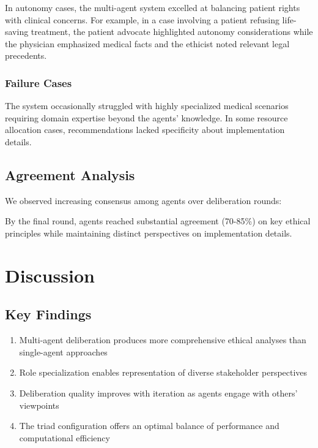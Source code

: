 \documentclass[11pt]{article}
\begin{document}
In autonomy cases, the multi-agent system excelled at balancing patient rights with clinical concerns. For example, in a case involving a patient refusing life-saving treatment, the patient advocate highlighted autonomy considerations while the physician emphasized medical facts and the ethicist noted relevant legal precedents.

\subsubsection{Failure Cases}

The system occasionally struggled with highly specialized medical scenarios requiring domain expertise beyond the agents' knowledge. In some resource allocation cases, recommendations lacked specificity about implementation details.

\subsection{Agreement Analysis}

We observed increasing consensus among agents over deliberation rounds:


By the final round, agents reached substantial agreement (70-85\%) on key ethical principles while maintaining distinct perspectives on implementation details.

\section{Discussion}

\subsection{Key Findings}

\begin{enumerate}
    \item Multi-agent deliberation produces more comprehensive ethical analyses than single-agent approaches
    \item Role specialization enables representation of diverse stakeholder perspectives
    \item Deliberation quality improves with iteration as agents engage with others' viewpoints
    \item The triad configuration offers an optimal balance of performance and computational efficiency
\end{enumerate}
\end{document}
